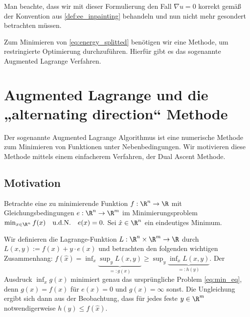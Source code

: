 \documentclass{mythesis}
\begin{document}
Man beachte, dass wir mit dieser Formulierung den Fall $\nabla u = 0$ korrekt gemäß der Konvention aus \ref{def:ee_inpainting} behandeln und nun nicht mehr gesondert betrachten müssen.

Zum Minimieren von \eqref{eq:energy_splitted} benötigen wir eine Methode, um restringierte Optimierung durchzuführen.
Hierfür gibt es das sogenannte Augmented Lagrange Verfahren.




\section{Augmented Lagrange und die „alternating direction“ Methode} \label{section:augmented_lagrange}

Der sogenannte Augmented Lagrange Algorithmus ist eine numerische Methode zum Minimieren von Funktionen unter Nebenbedingungen.
Wir motivieren diese Methode mittels einem einfacherem Verfahren, der Dual Ascent Methode.

\subsection*{Motivation}

Betrachte eine zu minimierende Funktion $f: \R^n \to \R$ mit Gleichungsbedingungen $e: \R^n \to \R^m$ im Minimierungsproblem
\begin{math}[numbered] \label{eq:min_eq}
    \min_{x \in \R^n} f(x)
    \quad \mathrm{u.d.N.} \quad
    e(x) = 0.
\end{math}
Sei $\hat x \in \R^n$ ein eindeutiges Minimum.

Wir definieren die Lagrange-Funktion $L: \R^n \times \R^m \to \R$ durch
\begin{math}
    L(x,y) := f(x) + y \cdot e(x)
\end{math}
und betrachten den folgenden wichtigen Zusammenhang:
\begin{math}
    f(\hat x)
    =
    \inf_{x} \underbrace{\sup_{y} L(x,y)}_{=:g(x)}
    \ge
    \sup_{y} \underbrace{\inf_{x} L(x,y)}_{=:h(y)}.
\end{math}
Der Ausdruck $\inf_x g(x)$ minimiert genau das ursprüngliche Problem \eqref{eq:min_eq}, denn $g(x) = f(x)$ für $e(x) = 0$ und $g(x) = \infty$ sonst.
Die Ungleichung ergibt sich dann aus der Beobachtung, dass für jedes feste $y \in \R^m$ notwendigerweise $h(y) \le f(\hat x)$.
\end{document}

